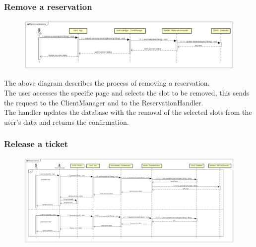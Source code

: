 \documentclass[table, 12pt]{article}
\begin{document}
\subsubsection{Remove a reservation}
\begin{figure}[H]
    \begin{center}
        \includegraphics[width=\textwidth]{assets/Sequence-Diagram/remove-a-booking.png}
    \end{center}
\end{figure}
The above diagram describes the process of removing a reservation.\\
The user accesses the specific page and selects the slot to be removed, this sends the request to the ClientManager and to the ReservationHandler.\\
The handler updates the database with the removal of the selected slots from the user's data and returns the confirmation. \\
\subsubsection{Release a ticket}
\begin{figure}[H]
    \begin{center}
        \includegraphics[width=\textwidth]{assets/Sequence-Diagram/release-a-ticket.png}
    \end{center}
\end{figure}
\end{document}

